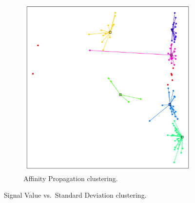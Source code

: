 \documentclass[11pt, letterpaper]{article}            %
\begin{document}
\begin{figure}[htbp]
\begin{subfigure}[b]{0.32\textwidth}
    \includegraphics[height=\textwidth]{./gfx/ap25.png}
    \caption{Affinity Propagation clustering.\label{fig:svstd:ap}}
  \end{subfigure}

  \caption{Signal Value vs.\ Standard Deviation clustering.\label{fig:svstd}}
\end{figure}
\end{document}
